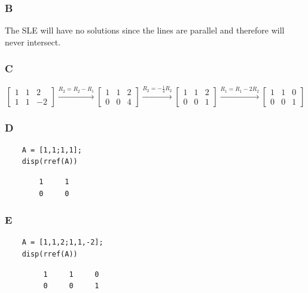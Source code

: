 \documentclass{article}
\begin{document}
\subsubsection*{B}

The SLE will have no solutions since the lines are parallel and therefore will never intersect.

\subsubsection*{C}

\[
	\begin{bmatrix}
		1 & 1 & 2  \\
		1 & 1 & -2
	\end{bmatrix}
	\xrightarrow{R_2 = R_2 - R_1}
	\begin{bmatrix}
		1 & 1 & 2 \\
		0 & 0 & 4
	\end{bmatrix}
	\xrightarrow{R_2 = -\frac{1}{4}R_2}
	\begin{bmatrix}
		1 & 1 & 2 \\
		0 & 0 & 1
	\end{bmatrix}
	\xrightarrow{R_1 = R_1 - 2R_2}
	\begin{bmatrix}
		1 & 1 & 0 \\
		0 & 0 & 1
	\end{bmatrix}
\]

\subsubsection*{D}

\begin{verbatim}
    A = [1,1;1,1];
    disp(rref(A))
    \end{verbatim}

\color{lightgray}
\begin{verbatim}
        1     1
        0     0
\end{verbatim}
\color{black}

\subsubsection*{E}

\begin{verbatim}
    A = [1,1,2;1,1,-2];
    disp(rref(A))
\end{verbatim}

\color{lightgray}
\begin{verbatim}
         1     1     0
         0     0     1
    
\end{verbatim}
\color{black}
\end{document}
